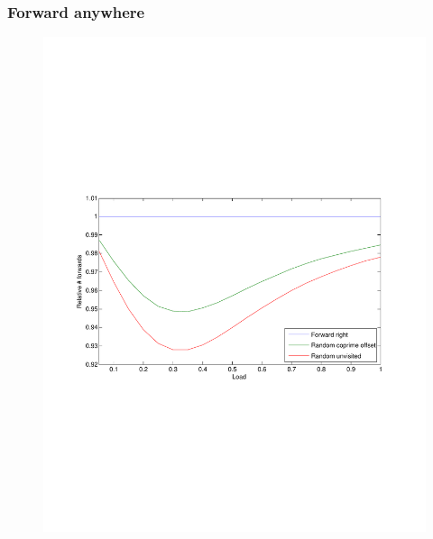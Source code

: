 \documentclass[compress]{beamer}
\begin{document}
\begin{frame}
\frametitle{Forward anywhere}
\begin{figure}[h!tb]
\includegraphics[width=\textwidth,clip=true,trim=4em 22em 6em 23em]{../resources/validate.pdf}
\end{figure}
\end{frame}
\end{document}
